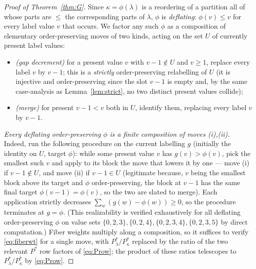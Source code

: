 \begin{proof}[Proof of Theorem~\ref{thm:G}]
Since $\kappa=\phi(\lambda)$ is a reordering of a partition all of whose parts are
$\le$ the corresponding parts of $\lambda$, $\phi$ is \emph{deflating}:
$\phi(v)\le v$ for every label value $v$ that occurs. We factor any such $\phi$ as
a composition of elementary order-preserving moves of two kinds, acting on the set
$U$ of currently present label values:
\begin{itemize}
\item[(i)] \emph{(gap decrement)} for a present value $v$ with $v-1\notin U$ and
$v\ge1$, replace every label $v$ by $v-1$; this is a \emph{strictly}
order-preserving relabelling of $U$ (it is injective and order-preserving since
the slot $v-1$ is empty and, by the same case-analysis as Lemma~\ref{lem:strict},
no two distinct present values collide);
\item[(ii)] \emph{(merge)} for present $v-1<v$ both in $U$, identify them, replacing
every label $v$ by $v-1$.
\end{itemize}
\emph{Every deflating order-preserving $\phi$ is a finite composition of moves
\textup{(i)},\textup{(ii)}.} Indeed, run the following procedure on the current
labelling $g$ (initially the identity on $U$, target $\phi$): while some present
value $v$ has $g(v)>\phi(v)$, pick the smallest such $v$ and apply to its block the
move that lowers it by one --- move \textup{(i)} if $v-1\notin U$, and move
\textup{(ii)} if $v-1\in U$ (legitimate because, $v$ being the smallest block above
its target and $\phi$ order-preserving, the block at $v-1$ has the same final
target $\phi(v-1)=\phi(v)$, so the two are slated to merge). Each application
strictly decreases $\sum_w (g(w)-\phi(w))\ge0$, so the procedure terminates at
$g=\phi$. (This realizability is verified exhaustively for all deflating
order-preserving $\phi$ on value sets $\{0,2,3\},\{0,2,4\},\{0,2,3,4\},\{0,2,3,5\}$
by direct computation.) Fiber weights multiply along a composition, so it suffices
to verify \eqref{eq:fiberwt} for a single move, with $P^*_\lambda/P^*_\kappa$
replaced by the ratio of the two relevant $P^*$ row factors of \eqref{eq:Prow}; the
product of these ratios telescopes to $P^*_\lambda/P^*_\kappa$ by \eqref{eq:Prow}.


\end{proof}
